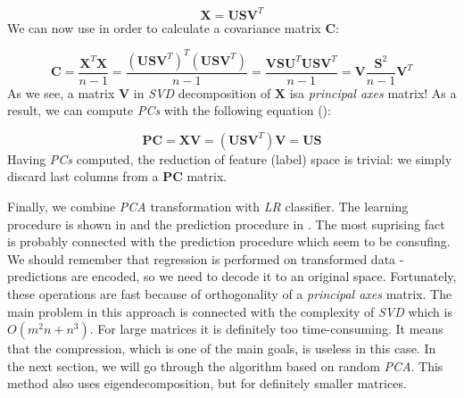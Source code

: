 \begin{equation}\label{eq:pca2}
    \boldsymbol{X}=\boldsymbol{U}\boldsymbol{S}\boldsymbol{V}^{T}
\end{equation}
We can now use  in order to calculate a covariance matrix $\boldsymbol{C}$:

\begin{equation}\label{eq:pca3}
    \boldsymbol{C}=\frac{\boldsymbol{X}^T\boldsymbol{X}}{n-1} = \frac{(\boldsymbol{U}\boldsymbol{S}\boldsymbol{V}^T)^T(\boldsymbol{U}\boldsymbol{S}\boldsymbol{V}^T)}{n-1} = \frac{\boldsymbol{V}\boldsymbol{S}\boldsymbol{U}^T\boldsymbol{U}\boldsymbol{S}\boldsymbol{V}^T}{n-1} = \boldsymbol{V}\frac{\boldsymbol{S}^{2}}{n-1}\boldsymbol{V}^{T} 
\end{equation}
As we see, a matrix $\boldsymbol{V}$ in \textit{SVD} decomposition of $\boldsymbol{X}$ isa \textit{principal axes} matrix! As a result, we can compute \textit{PCs} with the following equation (\cite{Jolliffe}): 

\begin{equation}\label{eq:pca4}
    \boldsymbol{PC} = \boldsymbol{X}\boldsymbol{V} = (\boldsymbol{U}\boldsymbol{S}\boldsymbol{V}^{T})\boldsymbol{V} = \boldsymbol{U}\boldsymbol{S}
\end{equation}
Having \textit{PCs} computed, the reduction of feature (label) space is trivial: we simply discard last columns from a $\boldsymbol{PC}$ matrix.  
 
Finally, we combine \textit{PCA} transformation with \textit{LR} classifier. The learning procedure is shown in  and the prediction procedure in . The most suprising fact is probably connected with the prediction procedure which seem to be consufing. We should remember that regression is performed on transformed data - predictions are encoded, so we need to decode it to an original space. Fortunately, these operations are fast because of orthogonality of a \textit{principal axes} matrix. The main problem in this approach is connected with the complexity of \textit{SVD} which is $O(m^2n+n^3)$. For large matrices it is definitely too time-consuming. It means that the compression, which is one of the main goals, is useless in this case. In the next section, we will go through the algorithm based on random \textit{PCA}. This method also uses eigendecomposition, but for definitely smaller matrices.


